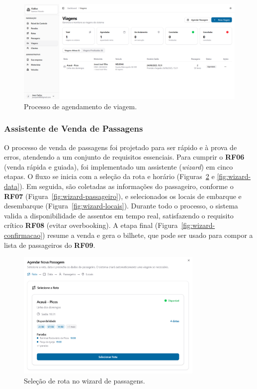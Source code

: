 \begin{figure}[H]
  \centering
  \includegraphics[width=1\textwidth]{imagens/agendamento-viagem.png}
  \caption{Processo de agendamento de viagem.}
  \label{fig:agendamento-viagem}
\end{figure}

\subsubsection{Assistente de Venda de Passagens}
O processo de venda de passagens foi projetado para ser rápido e à prova de erros, atendendo a um conjunto de requisitos essenciais. Para cumprir o \textbf{RF06} (venda rápida e guiada), foi implementado um assistente (\textit{wizard}) em cinco etapas. O fluxo se inicia com a seleção da rota e horário (Figuras~\ref{fig:wizard-rota} e \ref{fig:wizard-data}). Em seguida, são coletadas as informações do passageiro, conforme o \textbf{RF07} (Figura~\ref{fig:wizard-passageiro}), e selecionados os locais de embarque e desembarque (Figura~\ref{fig:wizard-locais}). Durante todo o processo, o sistema valida a disponibilidade de assentos em tempo real, satisfazendo o requisito crítico \textbf{RF08} (evitar overbooking). A etapa final (Figura~\ref{fig:wizard-confirmacao}) resume a venda e gera o bilhete, que pode ser usado para compor a lista de passageiros do \textbf{RF09}.

\begin{figure}[H]
  \centering
  \includegraphics[width=0.8\textwidth]{imagens/wizard-rota.png}
  \caption{Seleção de rota no wizard de passagens.}
  \label{fig:wizard-rota}
\end{figure}

